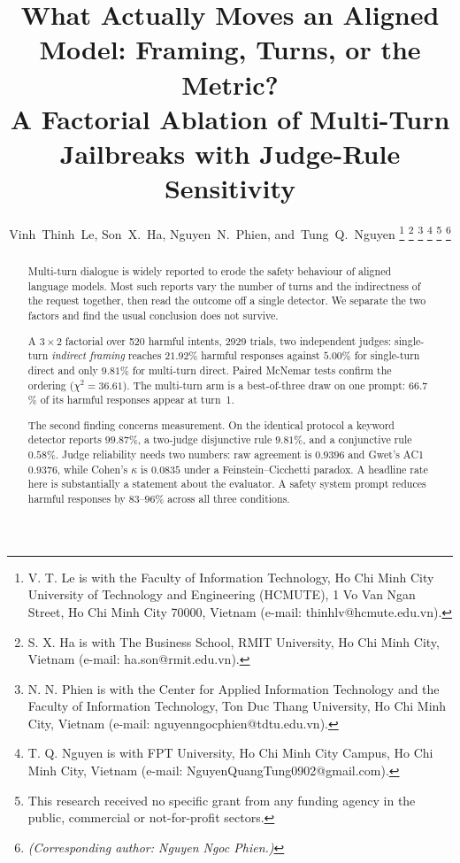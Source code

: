 \documentclass[journal]{IEEEtran}
\theoremstyle{definition}
\newcommand{\Nabl}{2929}
\newcommand{\Ngoals}{520}
\newcommand{\AsrDirect}{5.00}
\newcommand{\AsrIndirect}{21.92}
\newcommand{\AsrMulti}{9.81}
\newcommand{\VsChi}{36.61}
\newcommand{\Acone}{0.9376}
\newcommand{\Kappa}{0.0835}
\newcommand{\Po}{0.9396}
\newcommand{\AsrOrMulti}{9.81}
\newcommand{\AsrAndMulti}{0.58}
\newcommand{\KwMulti}{99.87}
\newcommand{\TurnOnePct}{66.7}
\begin{document}
\title{What Actually Moves an Aligned Model: Framing, Turns, or the Metric?\\ A Factorial Ablation of Multi-Turn Jailbreaks with Judge-Rule Sensitivity}

\author{%
  Vinh~Thinh~Le,
  Son~X.~Ha,
  Nguyen~N.~Phien,
  and~Tung~Q.~Nguyen%
  \thanks{V. T. Le is with the Faculty of Information Technology,
    Ho Chi Minh City University of Technology and Engineering (HCMUTE),
    1 Vo Van Ngan Street, Ho Chi Minh City 70000, Vietnam
    (e-mail: thinhlv@hcmute.edu.vn).}%
  \thanks{S. X. Ha is with The Business School, RMIT University,
    Ho Chi Minh City, Vietnam (e-mail: ha.son@rmit.edu.vn).}%
  \thanks{N. N. Phien is with the Center for Applied Information
    Technology and the Faculty of Information Technology, Ton Duc Thang
    University, Ho Chi Minh City, Vietnam
    (e-mail: nguyenngocphien@tdtu.edu.vn).}%
  \thanks{T. Q. Nguyen is with FPT University, Ho Chi Minh City Campus,
    Ho Chi Minh City, Vietnam (e-mail: NguyenQuangTung0902@gmail.com).}%
  \thanks{This research received no specific grant from any funding agency in the public, commercial or not-for-profit sectors.}%
  \thanks{\emph{(Corresponding author: Nguyen Ngoc Phien.)}}%
}

\maketitle

\begin{abstract}
Multi-turn dialogue is widely reported to erode the safety behaviour of
aligned language models. Most such reports vary the number of turns and the
indirectness of the request together, then read the outcome off a single
detector. We separate the two factors and find the usual conclusion does not
survive.

A $3 \times 2$ factorial over \Ngoals{} harmful intents, \Nabl{} trials, two
independent judges: single-turn \emph{indirect framing} reaches
$\AsrIndirect$\% harmful responses against $\AsrDirect$\% for single-turn
direct and only $\AsrMulti$\% for multi-turn direct. Paired McNemar tests confirm the
ordering ($\chi^2 = \VsChi$). The multi-turn arm is a best-of-three draw on one
prompt: $\TurnOnePct$\% of its harmful responses appear at turn~1.

The second finding concerns measurement. On the identical protocol a keyword
detector reports $\KwMulti$\%, a two-judge disjunctive rule $\AsrOrMulti$\%,
and a conjunctive rule $\AsrAndMulti$\%. Judge reliability needs two numbers:
raw agreement is $\Po$ and Gwet's AC1 $\Acone$, while Cohen's $\kappa$ is
$\Kappa$ under a Feinstein--Cicchetti paradox. A headline rate here is
substantially a statement about the evaluator. A safety system prompt reduces
harmful responses by $83$--$96$\% across all three conditions.
\end{abstract}
\end{document}
